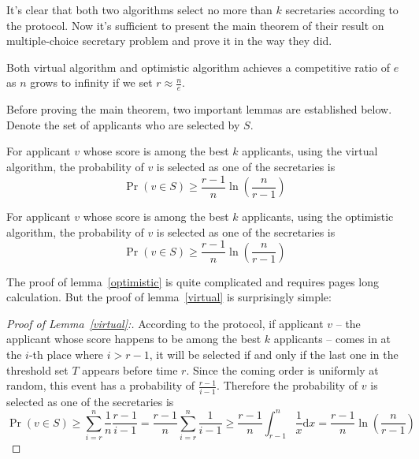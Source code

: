 It's clear that both two algorithms select no more than $k$ secretaries
according to the protocol. Now it's sufficient to present the main theorem
of their result on multiple-choice secretary problem and prove it in the
way they did.

\begin{theorem}\label{multichoice}
    Both virtual algorithm and optimistic algorithm achieves a competitive
    ratio of $e$ as $n$ grows to infinity if we set $r \approx \frac{n}{e}$.
\end{theorem}

Before proving the main theorem, two important lemmas are established below.
Denote the set of applicants who are selected by $S$.

\begin{lemma}\label{virtual}
    For applicant $v$ whose score is among the best $k$ applicants,
    using the virtual algorithm,
    the probability of $v$ is selected as one of the secretaries is
    $$\Pr(v \in S) \ge \frac{r - 1}{n} \ln(\frac{n}{r - 1})$$
\end{lemma}

\begin{lemma}\label{optimistic}
    For applicant $v$ whose score is among the best $k$ applicants,
    using the optimistic algorithm,
    the probability of $v$ is selected as one of the secretaries is
    $$\Pr(v \in S) \ge \frac{r - 1}{n} \ln(\frac{n}{r - 1})$$
\end{lemma}

The proof of lemma~\ref{optimistic} is quite complicated and requires
pages long calculation. But the proof of lemma~\ref{virtual} is 
surprisingly simple:

\begin{proof}[Proof of Lemma~\ref{virtual}:]
    According to the protocol, if applicant $v$ -- the applicant 
    whose score happens to be among the best $k$ applicants -- 
    comes in at the $i$-th place where $i > r - 1$, it will
    be selected if and only if the last one in the threshold set $T$
    appears before time $r$. Since the coming order is uniformly at random,
    this event has a probability of $\frac{r - 1}{i - 1}$. Therefore
    the probability of $v$ is selected as one of the secretaries is
    $$\Pr(v \in S) \ge \sum_{i=r}^{n} \frac{1}{n} \frac{r - 1}{i - 1}
    = \frac{r - 1}{n} \sum_{i=r}^{n} \frac{1}{i - 1}
    \ge \frac{r - 1}{n} \int_{r-1}^n \frac{1}{x} \mathrm{d}x
    = \frac{r - 1}{n} \ln(\frac{n}{r - 1})$$
\end{proof}

